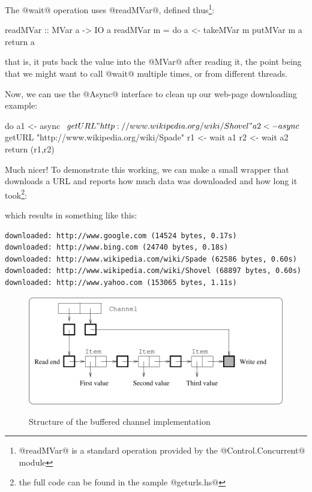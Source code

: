 The @wait@ operation uses @readMVar@, defined
thus\footnote{@readMVar@ is a standard operation provided by
  the @Control.Concurrent@ module}:

\begin{haskell}
readMVar :: MVar a -> IO a
readMVar m = do
  a <- takeMVar m
  putMVar m a
  return a
\end{haskell}

\noindent that is, it puts back the value into the @MVar@ after
reading it, the point being that we might want to call @wait@ multiple
times, or from different threads.

Now, we can use the @Async@ interface to clean up our
web-page downloading example:

\begin{numhaskell}
do
   a1 <- async $ getURL "http://www.wikipedia.org/wiki/Shovel"
   a2 <- async $ getURL "http://www.wikipedia.org/wiki/Spade"
   r1 <- wait a1
   r2 <- wait a2
   return (r1,r2)
\end{numhaskell}

Much nicer!  To demonstrate this working, we can make a small wrapper
that downloads a URL and reports how much data was downloaded and how
long it took\footnote{the full code can be found in the sample @geturls.hs@}:


\noindent which results in something like this:

{\scriptsize
\begin{verbatim}
downloaded: http://www.google.com (14524 bytes, 0.17s)
downloaded: http://www.bing.com (24740 bytes, 0.18s)
downloaded: http://www.wikipedia.com/wiki/Spade (62586 bytes, 0.60s)
downloaded: http://www.wikipedia.com/wiki/Shovel (68897 bytes, 0.60s)
downloaded: http://www.yahoo.com (153065 bytes, 1.11s)
\end{verbatim}
}

\begin{figure}
\includegraphics[scale=0.8]{channel.pdf}
\label{fig:channels}
\caption{Structure of the buffered channel implementation}
\end{figure}

